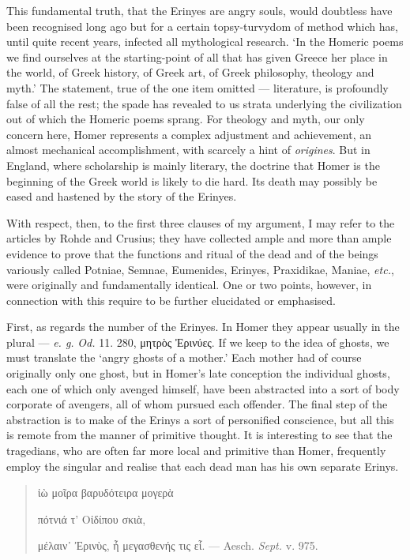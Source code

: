 \documentclass[a4paper, 11pt, oneside, polutonikogreek, english]{article}
\begin{document}
This fundamental truth, that the Erinyes are angry souls, would doubtless have been recognised long ago but for a certain topsy-turvydom of method which has, until quite recent years, infected all mythological research. `In the Homeric poems we find ourselves at the starting-point of all that has given Greece her place in the world, of Greek history, of Greek art, of Greek philosophy, theology and myth.' The statement, true of the one item omitted --- literature, is profoundly false of all the rest; the spade has revealed to us strata underlying the civilization out of which the Homeric poems sprang. For theology and myth, our only concern here, Homer represents a complex adjustment and achievement, an almost mechanical accomplishment, with scarcely a hint of \emph{origines}. But in England, where scholarship is mainly literary, the doctrine that Homer is the beginning of the Greek world is likely to die hard. Its death may possibly be eased and hastened by the story of the Erinyes.

With respect, then, to the first three clauses of my argument, I may refer to the articles by Rohde and Crusius; they have collected ample and more than ample evidence to prove that the functions and ritual of the dead and of the beings variously called Potniae, Semnae, Eumenides, Erinyes, Praxidikae, Maniae, \emph{etc.}, were originally and fundamentally identical. One or two points, however, in connection with this require to be further elucidated or emphasised.

First, as regards the number of the Erinyes. In Homer they appear usually in the plural --- \emph{e. g.} \emph{Od.} 11. 280, μητρὸς Ἐρινύες. If we keep to the idea of ghosts, we must translate the `angry ghosts of a mother.' Each mother had of course originally only one ghost, but in Homer's late conception the individual ghosts, each one of which only avenged himself, have been abstracted into a sort of body corporate of avengers, all of whom pursued each offender. The final step of the abstraction is to make of the Erinys a sort of personified conscience, but all this is remote from the manner of primitive thought. It is interesting to see that the tragedians, who are often far more local and primitive than Homer, frequently employ the singular and realise that each dead man has his own separate Erinys.
\begin{quotation}
ἰὼ μοῖρα βαρυδότειρα μογερὰ

πότνιά τ' Οἰδίπου σκιὰ,

μέλαιν᾽ Ἐρινὺς, ἦ μεγασθενής τις εἷ. --- Aesch. \emph{Sept.} v. 975.
\end{quotation}
\end{document}

